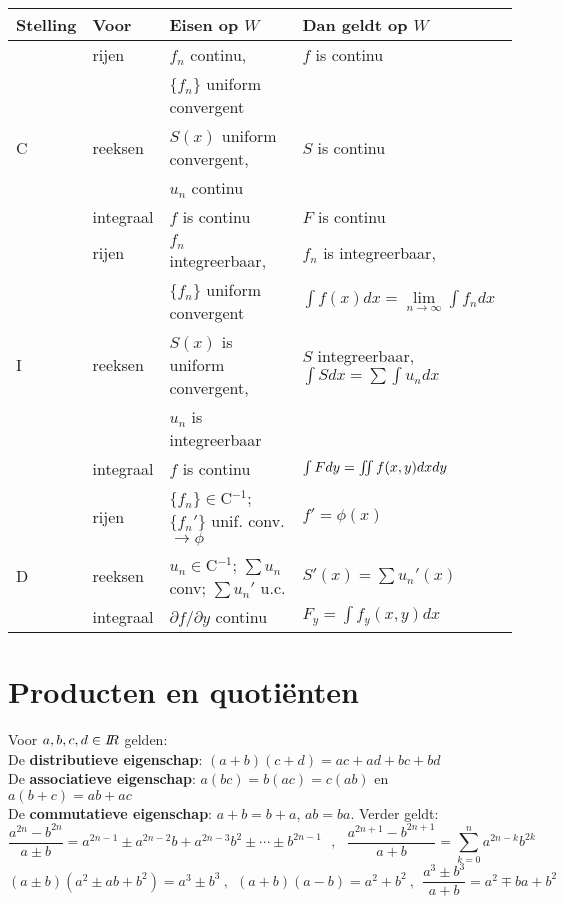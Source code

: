 \begin{center}
\begin{tabular}{||l|l|p{5cm}|p{6cm}||}
\hline
\bf Stelling&\bf Voor&\bf Eisen op $W$&\bf Dan geldt op $W$\\
\hline
\hline
 &rijen    &$f_n$ continu,                              &$f$ is continu\\
 &         &$\{f_n\}$ uniform convergent                &\\
\cline{2-4}
C&reeksen  &$S(x)$ uniform convergent,                  &$S$ is continu\\
 &         &$u_n$ continu                               &\\
\cline{2-4}
 &integraal&$f$ is continu                              &$F$ is continu\\
\hline
 &rijen    &$f_n$ integreerbaar,                        &$f_n$ is integreerbaar,\\
 &         &$\{f_n\}$ uniform convergent                &$\int f(x)dx=\lim\limits_{n\rightarrow\infty}\int f_ndx$\rule[-10pt]{0pt}{0pt}\\
\cline{2-4}
I&reeksen  &$S(x)$ is uniform convergent,               &$S$ integreerbaar, $\int Sdx=\sum\int u_ndx$\rule{0pt}{13pt}\\
 &         &$u_n$ is integreerbaar                      &\\
\cline{2-4}
 &integraal&$f$ is continu                              &$\int Fdy=\int\hspace*{-1.5mm}\int f(x,y)dxdy$\rule{0pt}{13pt}\rule[-8pt]{0pt}{0pt}\\
\hline
 &rijen    &$\{f_n\}\in$C$^{-1}$; $\{f_n'\}$ unif. conv.$\rightarrow\phi$&$f'=\phi(x)$\rule{0pt}{13pt}\rule[-7pt]{0pt}{0pt}\\
\cline{2-4}
D&reeksen  &$u_n\in$C$^{-1}$; $\sum u_n$ conv; $\sum u_n'$ u.c.&$S'(x)=\sum u_n'(x)$\rule{0pt}{13pt}\rule[-7pt]{0pt}{0pt}\\
\cline{2-4}
 &integraal&$\partial f/\partial y$ continu             &$F_y=\int f_y(x,y)dx$\rule{0pt}{13pt}\rule[-7pt]{0pt}{0pt}\\
\hline
\end{tabular}
\end{center}

\section{Producten en quoti\"enten}
Voor $a,b,c,d\in I\hspace{-1mm}R$ gelden:\\
De {\bf distributieve eigenschap}: $(a+b)(c+d)=ac+ad+bc+bd$\\
De {\bf associatieve eigenschap}: $a(bc)=b(ac)=c(ab)$ en $a(b+c)=ab+ac$\\
De {\bf commutatieve eigenschap}: $a+b=b+a$, $ab=ba$.
\npar
Verder geldt:
\[
\frac{a^{2n}-b^{2n}}{a\pm b}=a^{2n-1}\pm a^{2n-2}b+a^{2n-3}b^2\pm\cdots\pm b^{2n-1}~~~,~~~
\frac{a^{2n+1}-b^{2n+1}}{a+b}=\sum_{k=0}^n a^{2n-k}b^{2k}
\]
\[
(a\pm b)(a^2\pm ab+b^2)=a^3\pm b^3~,~~(a+b)(a-b)=a^2+b^2~,~~
\frac{a^3\pm b^3}{a+b}=a^2\mp ba+b^2
\]

